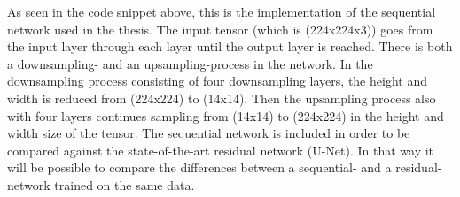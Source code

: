 \documentclass[USenglish]{ifimaster}  %
\begin{document}
As seen in the code snippet above, this is the implementation of the sequential network used in the thesis. The input tensor (which is (224x224x3)) goes from the input layer through each layer until the output layer is reached. 
There is both a downsampling- and an upsampling-process in the network. In the downsampling process consisting of four downsampling layers, the height and width is reduced from (224x224) to (14x14). Then the upsampling process also with four layers continues sampling from (14x14) to (224x224) in the height and width size of the tensor.
\newline
\newline
The sequential network is included in order to be compared against the state-of-the-art residual network (U-Net). In that way it will be possible to compare the differences between a sequential- and a residual-network trained on the same data. 
\end{document}
